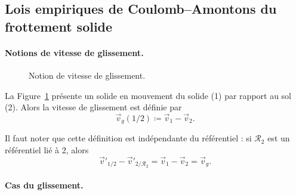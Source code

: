     \subsection{Lois empiriques de Coulomb--Amontons du frottement solide}

        \paragraph{Notions de vitesse de glissement.}

            \begin{figure}
                \centering
                \caption{Notion de vitesse de glissement.}    
                \label{fig:notion_vitesse_glissement}
            \end{figure}

            La Figure~\ref{fig:notion_vitesse_glissement} présente un solide en mouvement du solide (1) par rapport au sol (2). Alors la vitesse de glissement est définie par 
            \begin{equation*}
                \vec{v}_g(1/2)\coloneqq \vec{v}_1-\vec{v}_2.
            \end{equation*}

            Il faut noter que cette définition est indépendante du référentiel : si $\mathcal{R}_2$ est un référentiel lié à 2, alors 
            \begin{equation*}
                \vec{v}'_{1/2}-\vec{v}'_{2/\mathcal{R}_2}=\vec{v}_1-\vec{v}_2=\vec{v}_g.
            \end{equation*}

        \paragraph{Cas du glissement.} 
            
